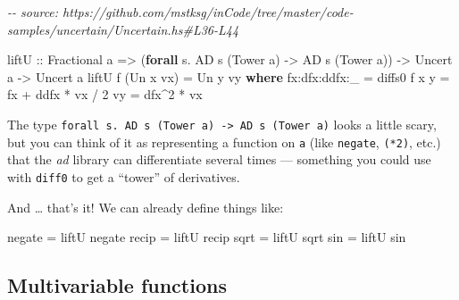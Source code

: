 \documentclass[]{article}
\newenvironment{Shaded}{}{}
\newcommand{\CommentTok}[1]{\textcolor[rgb]{0.38,0.63,0.69}{\textit{#1}}}
\newcommand{\DataTypeTok}[1]{\textcolor[rgb]{0.56,0.13,0.00}{#1}}
\newcommand{\DecValTok}[1]{\textcolor[rgb]{0.25,0.63,0.44}{#1}}
\newcommand{\FunctionTok}[1]{\textcolor[rgb]{0.02,0.16,0.49}{#1}}
\newcommand{\KeywordTok}[1]{\textcolor[rgb]{0.00,0.44,0.13}{\textbf{#1}}}
\newcommand{\NormalTok}[1]{#1}
\newcommand{\OperatorTok}[1]{\textcolor[rgb]{0.40,0.40,0.40}{#1}}
\newcommand{\OtherTok}[1]{\textcolor[rgb]{0.00,0.44,0.13}{#1}}
\begin{document}
\begin{Shaded}
\begin{Highlighting}[]
\CommentTok{{-}{-} source: https://github.com/mstksg/inCode/tree/master/code{-}samples/uncertain/Uncertain.hs\#L36{-}L44}

\OtherTok{liftU ::} \DataTypeTok{Fractional}\NormalTok{ a}
      \OtherTok{=>}\NormalTok{ (}\KeywordTok{forall}\NormalTok{ s}\OperatorTok{.} \DataTypeTok{AD}\NormalTok{ s (}\DataTypeTok{Tower}\NormalTok{ a) }\OtherTok{{-}>} \DataTypeTok{AD}\NormalTok{ s (}\DataTypeTok{Tower}\NormalTok{ a))}
      \OtherTok{{-}>} \DataTypeTok{Uncert}\NormalTok{ a}
      \OtherTok{{-}>} \DataTypeTok{Uncert}\NormalTok{ a}
\NormalTok{liftU f (}\DataTypeTok{Un}\NormalTok{ x vx) }\OtherTok{=} \DataTypeTok{Un}\NormalTok{ y vy}
  \KeywordTok{where}
\NormalTok{    fx}\OperatorTok{:}\NormalTok{dfx}\OperatorTok{:}\NormalTok{ddfx}\OperatorTok{:}\NormalTok{\_ }\OtherTok{=}\NormalTok{ diffs0 f x}
\NormalTok{    y             }\OtherTok{=}\NormalTok{ fx }\OperatorTok{+}\NormalTok{ ddfx }\OperatorTok{*}\NormalTok{ vx }\OperatorTok{/} \DecValTok{2}
\NormalTok{    vy            }\OtherTok{=}\NormalTok{ dfx}\OperatorTok{\^{}}\DecValTok{2} \OperatorTok{*}\NormalTok{ vx}
\end{Highlighting}
\end{Shaded}

The type
\texttt{forall\ s.\ AD\ s\ (Tower\ a)\ -\textgreater{}\ AD\ s\ (Tower\ a)} looks
a little scary, but you can think of it as representing a function on \texttt{a}
(like \texttt{negate}, \texttt{(*2)}, etc.) that the \emph{ad} library can
differentiate several times --- something you could use with \texttt{diff0} to
get a ``tower'' of derivatives.

And \ldots{} that's it! We can already define things like:

\begin{Shaded}
\begin{Highlighting}[]
\FunctionTok{negate} \OtherTok{=}\NormalTok{ liftU }\FunctionTok{negate}
\FunctionTok{recip}  \OtherTok{=}\NormalTok{ liftU }\FunctionTok{recip}
\FunctionTok{sqrt}   \OtherTok{=}\NormalTok{ liftU }\FunctionTok{sqrt}
\FunctionTok{sin}    \OtherTok{=}\NormalTok{ liftU }\FunctionTok{sin}
\end{Highlighting}
\end{Shaded}

\hypertarget{multivariable-functions}{%
\subsection{Multivariable functions}\label{multivariable-functions}}
\end{document}
